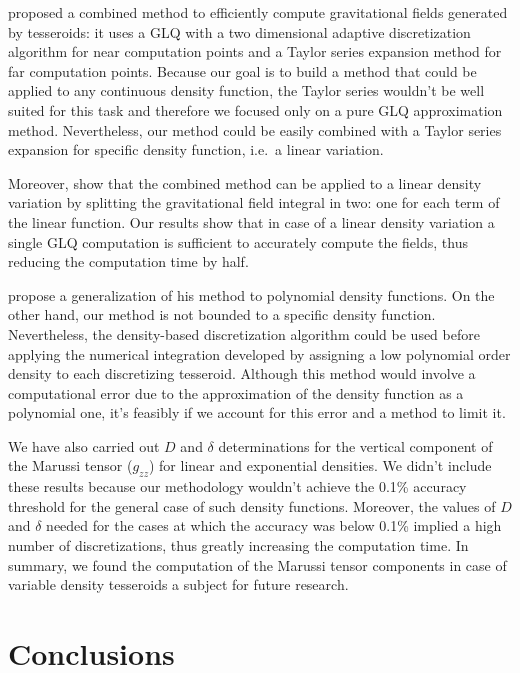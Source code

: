 \documentclass[extra, referee]{gji}
\begin{document}
\citet{Lin2018} proposed a combined method to efficiently compute gravitational fields
generated by tesseroids: it uses a GLQ with a two dimensional adaptive discretization
algorithm for near computation points and a Taylor series expansion method for far
computation points.
Because our goal is to build a method that could be applied to any continuous density
function, the Taylor series wouldn't be well suited for this task and therefore we
focused only on a pure GLQ approximation method.
Nevertheless, our method could be easily combined with a Taylor series expansion for
specific density function, i.e.~a linear variation.

Moreover, \citet{Lin2018} show that the combined method can be applied to a linear
density variation by splitting the gravitational field integral in two: one for each
term of the linear function.
Our results show that in case of a linear density variation a single GLQ computation is
sufficient to accurately compute the fields, thus reducing the computation time by half.

\citet{Fukushima2018} propose a generalization of his method to polynomial density
functions.
On the other hand, our method is not bounded to a specific density function.
Nevertheless, the density-based discretization algorithm could be used before applying
the numerical integration developed by \citet{Fukushima2018} assigning a low polynomial
order density to each discretizing tesseroid.
Although this method would involve a computational error due to the approximation of the
density function as a polynomial one, it's feasibly if we account for this error and
a method to limit it.

We have also carried out $D$ and $\delta$ determinations for the vertical component of
the Marussi tensor ($g_{zz}$) for linear and exponential densities.
We didn't include these results because our methodology wouldn't achieve the 0.1\%
accuracy threshold for the general case of such density functions.
Moreover, the values of $D$ and $\delta$ needed for the cases at which the accuracy was
below 0.1\% implied a high number of discretizations, thus greatly increasing the
computation time.
In summary, we found the computation of the Marussi tensor components in case of
variable density tesseroids a subject for future research.


\section{Conclusions}
\end{document}
